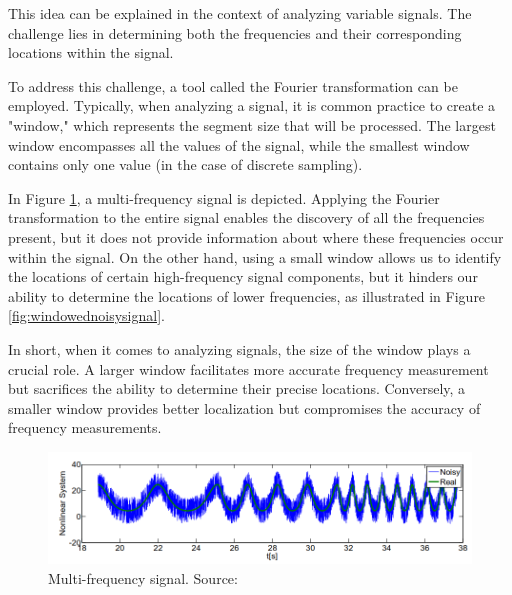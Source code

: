 		\par This idea can be explained in the context of analyzing variable signals. The challenge lies in determining both the frequencies and their corresponding locations within the signal.\newline
		
		\par To address this challenge, a tool called the Fourier transformation can be employed. Typically, when analyzing a signal, it is common practice to create a "window," which represents the segment size that will be processed. The largest window encompasses all the values of the signal, while the smallest window contains only one value (in the case of discrete sampling).\newline
		
		\par In Figure \ref{fig:noisysignal}, a multi-frequency signal is depicted. Applying the Fourier transformation to the entire signal enables the discovery of all the frequencies present, but it does not provide information about where these frequencies occur within the signal. On the other hand, using a small window allows us to identify the locations of certain high-frequency signal components, but it hinders our ability to determine the locations of lower frequencies, as illustrated in Figure \ref{fig:windowednoisysignal}.\newline
		
		\par In short, when it comes to analyzing signals, the size of the window plays a crucial role. A larger window facilitates more accurate frequency measurement but sacrifices the ability to determine their precise locations. Conversely, a smaller window provides better localization but compromises the accuracy of frequency measurements.

	
		\begin{figure}[h]
			\centering
			\includegraphics[width=1\linewidth]{images/noisySignal}
			\caption[Multi-frequency signal]{Multi-frequency signal. Source: \cite{olama2011design}}
			\label{fig:noisysignal}
		\end{figure}
		
